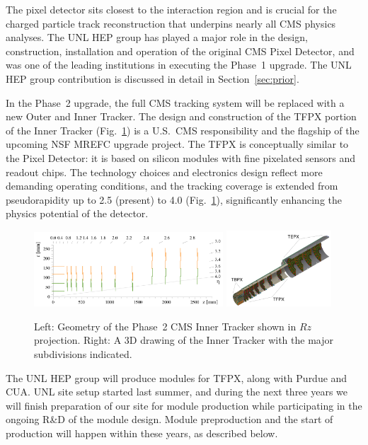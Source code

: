 The pixel detector sits closest to the interaction region and is crucial for the charged particle track reconstruction that underpins nearly all CMS physics analyses. The UNL HEP group has played a major role in the design, construction, installation and operation of the original CMS Pixel Detector, and was one of the leading institutions in executing the Phase~1 upgrade. The UNL HEP group contribution is discussed in detail in Section~\ref{sec:prior}. 

In the Phase~2 upgrade, the full CMS tracking system will be replaced with a new Outer and Inner Tracker\cite{bib:Phase2TDR}. The design and construction of the TFPX portion of the Inner Tracker (Fig.~\ref{fig:TFPX}) is a U.S.~CMS responsibility and the flagship of the upcoming NSF MREFC upgrade project.  The TFPX is conceptually similar to the Pixel Detector: it is based on silicon modules with fine pixelated sensors and readout chips. The technology choices and electronics design reflect more demanding operating conditions, and the tracking coverage is extended from pseudorapidity up to 2.5 (present) to 4.0 (Fig.~\ref{fig:TFPX}), significantly enhancing the physics potential of the detector. 


\begin{figure}
\centering\includegraphics[width=0.63\textwidth]{figs/phase2_inner_tracker_geometry_lowres.png}
\centering\includegraphics[width=0.35\textwidth]{figs/phsae2_inner_tracker_3D.png}
\caption{\label{fig:TFPX} Left: Geometry of the Phase~2 CMS Inner Tracker shown in $Rz$ projection. Right: A 3D drawing of the Inner Tracker with the major subdivisions indicated.}
\end{figure}

The UNL HEP group will produce modules for TFPX, along with Purdue and CUA.  UNL site setup started last summer, and during the next three years we will finish preparation of our site for module production while participating in the ongoing R\&D of the module design. Module preproduction and the start of production will happen within these years, as described below.

